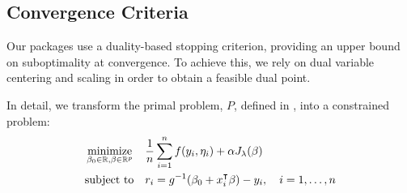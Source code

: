 \documentclass[article]{jss}
\let\Cref\crtCref
\begin{document}
\subsection{Convergence Criteria}

Our packages use a duality-based stopping criterion, providing an upper
bound on suboptimality at convergence. To achieve this, we rely
on dual variable centering and scaling in order to obtain a feasible dual
point.

In detail, we transform the primal problem, \(P\), defined in \Cref{eq:slope}, into a
constrained problem:
\begin{equation}
  \label{eq:slope-constrained}
  \begin{aligned}
     & \operatorname*{minimize}_{\beta_0 \in \mathbb{R},\beta \in \mathbb{R}^p} &  & \frac{1}{n} \sum_{i=1}^n f(y_i, \eta_i) + \alpha J_{\lambda}(\beta)       \\
     & \text{subject to}                                         &  & r_i = g^{-1}(\beta_0 + x_i^\intercal \beta) - y_i, \quad i = 1, \ldots, n \\
  \end{aligned}
\end{equation}
\end{document}
